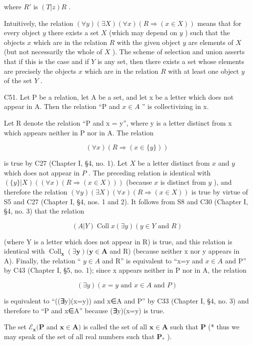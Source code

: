 where \(R'\) is \((T|z)R\) .

Intuitively, the relation \((\forall y)(\exists X)(\forall x)(R \Rightarrow (x \in X))\) means that for every object \(y\) there exists a set \(X\) (which may depend on \(y\) ) such that the objects \(x\) which are in the relation \(R\) with the given object \(y\) are elements of \(X\) (but not necessarily the whole of \(X\) ). The scheme of selection and union asserts that if this is the case and if \(Y\) is any set, then there exists a set whose elements are precisely the objects \(x\) which are in the relation \(R\) with at least one object \(y\) of the set \(Y\) .

C51. Let P be a relation, let A be a set, and let x be a letter which does not appear in A. Then the relation ``P and \(x \in A\) '' is collectivizing in x.

Let R denote the relation ``P and x = y'', where y is a letter distinct from x which appears neither in P nor in A. The relation

\[
(\forall x) (R \Longrightarrow (x \in \{y \}))
\]

is true by C27 (Chapter I, §4, no. 1). Let \(X\) be a letter distinct from \(x\) and \(y\) which does not appear in \(P\) . The preceding relation is identical with \((\{y\}|X)((\forall x)(R \Longrightarrow (x \in X)))\) (because \(x\) is distinct from \(y\) ), and therefore the relation \((\forall y)(\exists X)(\forall x)(R \Longrightarrow (x \in X))\) is true by virtue of S5 and C27 (Chapter I, §4, nos. 1 and 2). It follows from S8 and C30 (Chapter I, §4, no. 3) that the relation

\[
(A | Y) \operatorname{Coll} x (\exists y) (y \in Y \text {   and   } R)
\]

(where Y is a letter which does not appear in R) is true, and this relation is identical with \(\operatorname{Coll}_{\mathbf{x}}(\exists\mathbf{y})(\mathbf{y}\in\mathbf{A}\) and R) (because neither x nor y appears in A). Finally, the relation `` \(y\in A\) and R'' is equivalent to ``x=y and \(x\in A\) and P'' by C43 (Chapter I, §5, no. 1); since x appears neither in P nor in A, the relation

\[
(\exists y) (x = y \text {   and   } x \in A \text {   and   } P)
\]

is equivalent to ``((∃y)(x=y)) and x∈A and P'' by C33 (Chapter I, §4, no. 3) and therefore to ``P and x∈A'' because (∃y)(x=y) is true.

The set \(\mathcal{E}_{\pmb{x}}(\pmb{P}\) and \(\pmb{x} \in \pmb{A})\) is called the set of all \(\pmb{x} \in \pmb{A}\) such that \(\pmb{P}\) (* thus we may speak of the set of all real numbers such that \(\pmb{P}_{*}\) ).


